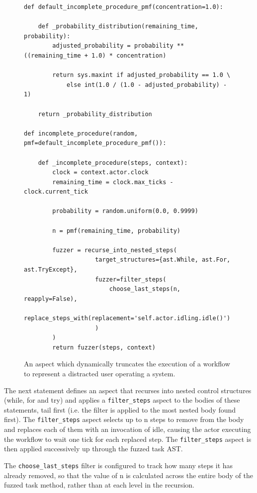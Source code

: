 \documentclass{llncs}
\begin{document}
\begin{figure}
  \centering
\begin{lstlisting}
def default_incomplete_procedure_pmf(concentration=1.0):

    def _probability_distribution(remaining_time, probability):
        adjusted_probability = probability ** ((remaining_time + 1.0) * concentration)

        return sys.maxint if adjusted_probability == 1.0 \
            else int(1.0 / (1.0 - adjusted_probability) - 1)

    return _probability_distribution

def incomplete_procedure(random, pmf=default_incomplete_procedure_pmf()):

    def _incomplete_procedure(steps, context):
        clock = context.actor.clock
        remaining_time = clock.max_ticks - clock.current_tick

        probability = random.uniform(0.0, 0.9999)

        n = pmf(remaining_time, probability)

        fuzzer = recurse_into_nested_steps(
                    target_structures={ast.While, ast.For, ast.TryExcept},
                    fuzzer=filter_steps(
                        choose_last_steps(n, reapply=False),
                        replace_steps_with(replacement='self.actor.idling.idle()')
                    )
        )
        return fuzzer(steps, context)
\end{lstlisting}
  \caption{An aspect which dynamically truncates the execution of a workflow to represent a distracted user operating a
    system.}
  \label{fig:distraction-fuzzer}
\end{figure}


The next statement defines an aspect that recurses into nested control structures (while, for and try) and applies a
\lstinline!filter_steps! aspect to the bodies of these statements, tail first (i.e. the filter is applied to the most
nested body found first).  The \lstinline!filter_steps! aspect selects up to n steps to remove from the body and
replaces each of them with an invocation of idle, causing the actor executing the workflow to wait one tick for each
replaced step.  The \lstinline!filter_steps! aspect is then applied successively up through the fuzzed task AST.

The \lstinline!choose_last_steps! filter is configured to track how many steps it has already removed, so that the value
of n is calculated across the entire body of the fuzzed task method, rather than at each level in the recursion.
\end{document}
